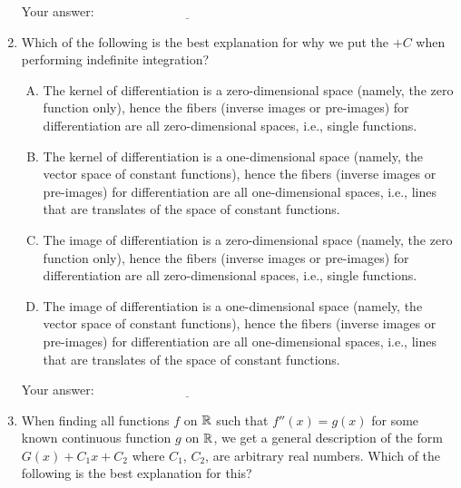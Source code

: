 \documentclass[10pt]{amsart}
\begin{document}
\begin{enumerate}
  \vspace{0.1in}
  Your answer: $\underline{\qquad\qquad\qquad\qquad\qquad\qquad\qquad}$
  \vspace{0.1in}

\item Which of the following is the best explanation for why we put
  the $+C$ when performing indefinite integration?

  \begin{enumerate}[(A)]
  \item The kernel of differentiation is a zero-dimensional space
    (namely, the zero function only), hence the fibers (inverse images
    or pre-images) for differentiation are all zero-dimensional spaces,
    i.e., single functions.
  \item The kernel of differentiation is a one-dimensional space
    (namely, the vector space of constant functions), hence the fibers
    (inverse images or pre-images) for differentiation are all
    one-dimensional spaces, i.e., lines that are translates of the
    space of constant functions.
  \item The image of differentiation is a zero-dimensional space
    (namely, the zero function only), hence the fibers (inverse images
    or pre-images) for differentiation are all zero-dimensional spaces,
    i.e., single functions.
  \item The image of differentiation is a one-dimensional space
    (namely, the vector space of constant functions), hence the fibers
    (inverse images or pre-images) for differentiation are all
    one-dimensional spaces, i.e., lines that are translates of the
    space of constant functions.
  \end{enumerate}

  \vspace{0.1in}
  Your answer: $\underline{\qquad\qquad\qquad\qquad\qquad\qquad\qquad}$
  \vspace{0.1in}

\item When finding all functions $f$ on $\mathbb{R}$ such that $f''(x) = g(x)$
  for some known continuous function $g$ on $\mathbb{R}$, we get a general
  description of the form $G(x) + C_1x + C_2$ where $C_1$, $C_2$, are
  arbitrary real numbers. Which of the following is the best
  explanation for this?


\end{enumerate}
\end{document}
